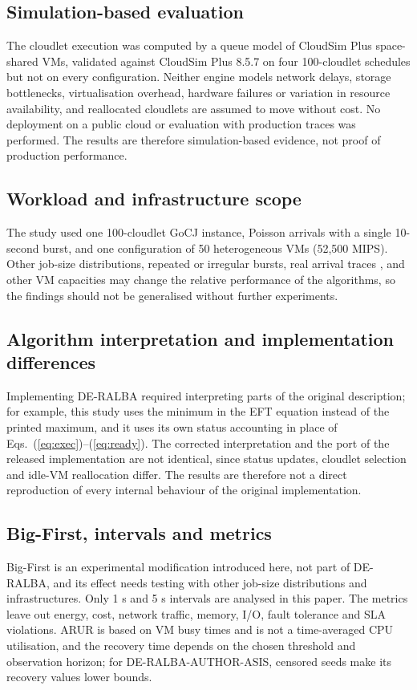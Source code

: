 \documentclass[default,sn-mathphys,Numbered]{sn-jnl}
\begin{document}
\subsection{Simulation-based evaluation}
The cloudlet execution was computed by a queue model of CloudSim Plus space-shared VMs, validated against CloudSim Plus 8.5.7 on four 100-cloudlet schedules but not on every configuration. Neither engine models network delays, storage bottlenecks, virtualisation overhead, hardware failures or variation in resource availability, and reallocated cloudlets are assumed to move without cost. No deployment on a public cloud or evaluation with production traces was performed. The results are therefore simulation-based evidence, not proof of production performance.

\subsection{Workload and infrastructure scope}
The study used one 100-cloudlet GoCJ instance, Poisson arrivals with a single 10-second burst, and one configuration of 50 heterogeneous VMs (52,500 MIPS). Other job-size distributions, repeated or irregular bursts, real arrival traces \cite{reiss2012heterogeneity}, and other VM capacities may change the relative performance of the algorithms, so the findings should not be generalised without further experiments.

\subsection{Algorithm interpretation and implementation differences}
Implementing DE-RALBA required interpreting parts of the original description; for example, this study uses the minimum in the EFT equation instead of the printed maximum, and it uses its own status accounting in place of Eqs.~(\ref{eq:exec})--(\ref{eq:ready}). The corrected interpretation and the port of the released implementation are not identical, since status updates, cloudlet selection and idle-VM reallocation differ. The results are therefore not a direct reproduction of every internal behaviour of the original implementation.

\subsection{Big-First, intervals and metrics}
Big-First is an experimental modification introduced here, not part of DE-RALBA, and its effect needs testing with other job-size distributions and infrastructures. Only 1 s and 5 s intervals are analysed in this paper. The metrics leave out energy, cost, network traffic, memory, I/O, fault tolerance and SLA violations. ARUR is based on VM busy times and is not a time-averaged CPU utilisation, and the recovery time depends on the chosen threshold and observation horizon; for DE-RALBA-AUTHOR-ASIS, censored seeds make its recovery values lower bounds.
\end{document}
